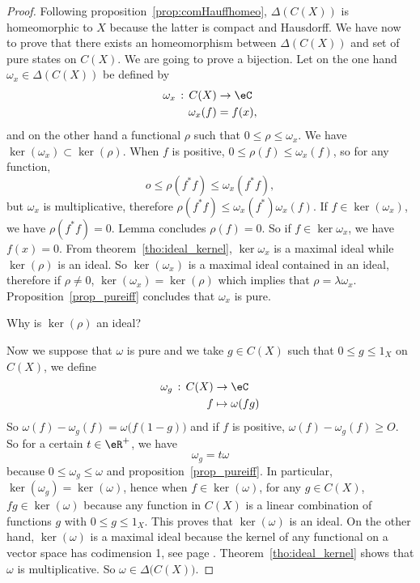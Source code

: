 \begin{proof}
	Following proposition~\ref{prop:comHauffhomeo}, $\Delta(C(X))$ is homeomorphic to $X$ because the latter is compact and Hausdorff. We have now to prove that there exists an homeomorphism between $\Delta(C(X))$ and set of pure states on $C(X)$. We are going to prove a bijection. Let on the one hand $\omega_x\in\Delta(C(X))$ be defined by
	\begin{equation}
		\begin{aligned}
			\omega_x\,:\,C(X) & \to \eC \\
			\omega_x(f)       & = f(x),
		\end{aligned}
	\end{equation}
	and on the other hand a functional $\rho$ such that $0\leq\rho\leq\omega_x$. We have $\ker(\omega_x)\subset\ker(\rho)$. When $f$ is positive, $0\leq\rho(f)\leq\omega_x(f)$, so for any function,
	\[
		o\leq\rho(f^*f)\leq\omega_x(f^*f),
	\]
	but $\omega_x$ is multiplicative, therefore $\rho(f^*f)\leq\omega_x(f^*)\omega_x(f)$. If $f\in\ker(\omega_x)$, we have $\rho(f^*f)=0$. Lemma concludes $\rho(f)=0$. So if $f\in\ker\omega_x$, we have $f(x)=0$. From theorem~\ref{tho:ideal_kernel}, $\ker\omega_x$ is a maximal ideal while $\ker(\rho)$ is an ideal. So $\ker(\omega_x)$ is a maximal ideal contained in an ideal, therefore if $\rho\neq0$, $\ker(\omega_x)=\ker(\rho)$ which implies that $\rho=\lambda\omega_x$. Proposition~\ref{prop_pureiff} concludes that $\omega_x$ is pure.

	\begin{probleme}
		Why is $\ker(\rho)$ an ideal?
	\end{probleme}


	Now we suppose that $\omega$ is pure and we take  $g\in C(X)$ such that $0\leq g\leq 1_X$ on $C(X)$, we define
	\begin{equation}
		\begin{aligned}
			\omega_g\,:\,C(X) & \to \eC            \\
			f                 & \mapsto \omega(fg)
		\end{aligned}
	\end{equation}
	So  $\omega(f)-\omega_g(f)=\omega\big( f(1-g) \big)$ and if $f$ is positive, $\omega(f)-\omega_g(f)\geq O$. So for a certain $t\in\eR^+$, we have
	\[
		\omega_g=t\omega
	\]
	because $0\leq\omega_g\leq\omega$ and proposition~\ref{prop_pureiff}. In particular, $\ker (\omega_g)=\ker(\omega)$, hence when $f\in \ker(\omega)$, for any $g\in C(X)$, $fg \in \ker(\omega)$ because any function in $C(X)$ is a linear combination of functions $g$ with $0\leq g\leq 1_X$. This proves that $\ker (\omega)$ is an ideal. On the other hand, $\ker (\omega)$ is a maximal ideal because the kernel of any functional on a vector space has codimension 1, see page \pageref{pg_codimun}. Theorem~\ref{tho:ideal_kernel} shows that $\omega$ is multiplicative. So $\omega\in\Delta\big( C(X) \big)$.

\end{proof}

